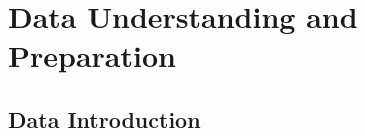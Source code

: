 \chapter{Data Understanding and Preparation}
\label{ch:capitolo1}













\section{Data Introduction}\label{sec:data_intro}


% 


